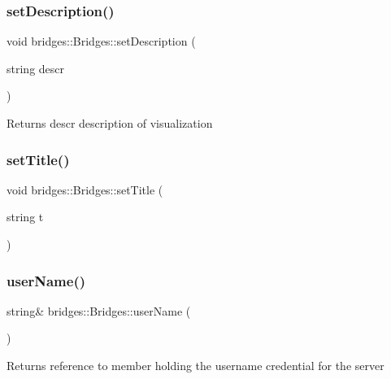 \subsubsection{\texorpdfstring{set\+Description()}{setDescription()}}
{\footnotesize\ttfamily void bridges\+::\+Bridges\+::set\+Description (\begin{DoxyParamCaption}\item[{string}]{descr }\end{DoxyParamCaption})}

\begin{DoxyReturn}{Returns}
descr description of visualization 
\end{DoxyReturn}
\hypertarget{namespacebridges_1_1_bridges_af36e132d582dabf5ae5ee8b8f26976db}{}\label{namespacebridges_1_1_bridges_af36e132d582dabf5ae5ee8b8f26976db} 
\subsubsection{\texorpdfstring{set\+Title()}{setTitle()}}
{\footnotesize\ttfamily void bridges\+::\+Bridges\+::set\+Title (\begin{DoxyParamCaption}\item[{string}]{t }\end{DoxyParamCaption})}

\hypertarget{namespacebridges_1_1_bridges_a98c0c6658b8eb9e8f20a7f3119cbd984}{}\label{namespacebridges_1_1_bridges_a98c0c6658b8eb9e8f20a7f3119cbd984} 
\subsubsection{\texorpdfstring{user\+Name()}{userName()}}
{\footnotesize\ttfamily string\& bridges\+::\+Bridges\+::user\+Name (\begin{DoxyParamCaption}{ }\end{DoxyParamCaption})}

\begin{DoxyReturn}{Returns}
reference to member holding the username credential for the server 
\end{DoxyReturn}
\hypertarget{namespacebridges_1_1_bridges_a2806e395134614cdd6327400b53d28ad}{}\label{namespacebridges_1_1_bridges_a2806e395134614cdd6327400b53d28ad} 

